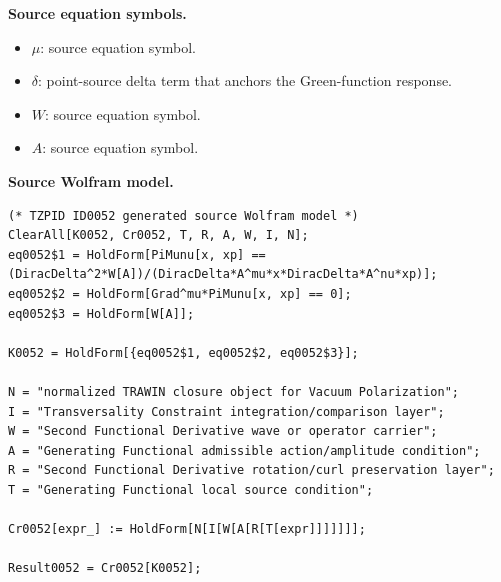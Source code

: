 \begin{minipage}[t]{0.49\linewidth}
\begingroup
\small
\raggedright
\textbf{Source equation symbols.}\par
\begin{itemize}[leftmargin=1.35em,itemsep=1pt,topsep=1pt,parsep=0pt]
    \item $\mu$: source equation symbol.
    \item $\delta$: point-source delta term that anchors the Green-function response.
    \item $W$: source equation symbol.
    \item $A$: source equation symbol.
\end{itemize}
\endgroup
\end{minipage}\hfill
\begin{minipage}[t]{0.47\linewidth}
\begingroup
\scriptsize
\raggedright
\textbf{Source Wolfram model.}\par
\begin{Verbatim}[fontsize=\tiny,breaklines=true,breakanywhere=true]
(* TZPID ID0052 generated source Wolfram model *)
ClearAll[K0052, Cr0052, T, R, A, W, I, N];
eq0052$1 = HoldForm[PiMunu[x, xp] == (DiracDelta^2*W[A])/(DiracDelta*A^mu*x*DiracDelta*A^nu*xp)];
eq0052$2 = HoldForm[Grad^mu*PiMunu[x, xp] == 0];
eq0052$3 = HoldForm[W[A]];

K0052 = HoldForm[{eq0052$1, eq0052$2, eq0052$3}];

N = "normalized TRAWIN closure object for Vacuum Polarization";
I = "Transversality Constraint integration/comparison layer";
W = "Second Functional Derivative wave or operator carrier";
A = "Generating Functional admissible action/amplitude condition";
R = "Second Functional Derivative rotation/curl preservation layer";
T = "Generating Functional local source condition";

Cr0052[expr_] := HoldForm[N[I[W[A[R[T[expr]]]]]]];

Result0052 = Cr0052[K0052];
\end{Verbatim}
\endgroup
\end{minipage}

